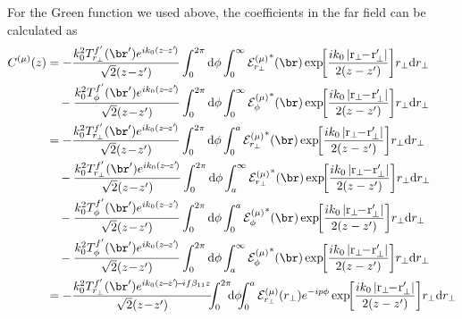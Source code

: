 \documentclass[]{report}
\begin{document}
For the Green function we used above, the coefficients in the far field can be calculated as
\begin{align}
C^{(\mu)} (z) &= - \frac{k_0^2 T^{f'}_{r_\perp}(\br') e^{ik_0(z\!-\!z'\!)}}{\sqrt{2}(z\!-\!z')}\int_0^{2\pi}\mathrm{d}\phi \int_0^\infty {\mathcal{E}^{(\mu)}_{r_\perp}}^* (\br) \exp\!\! \left[ \frac{ik_0 \left| \mathrm{r}_\perp\!\! -\! \mathrm{r}_\perp'\right|}{2(z-z')}  \right]\!  r_\perp \mathrm{d}r_\perp \nonumber\\
&\quad - \frac{k_0^2 T^{f'}_\phi(\br') e^{ik_0(z\!-\!z'\!)} }{\sqrt{2}(z\!-\!z')}\int_0^{2\pi}\mathrm{d}\phi \int_0^\infty {\mathcal{E}^{(\mu)}_\phi}^* (\br) \exp\!\! \left[ \frac{ik_0 \left| \mathrm{r}_\perp\!\! -\! \mathrm{r}_\perp'\right|}{2(z-z')}  \right]\!  r_\perp \mathrm{d}r_\perp \\
&=  - \frac{k_0^2 T^{f'}_{r_\perp}(\br') e^{ik_0(z\!-\!z'\!)}}{\sqrt{2}(z\!-\!z')}\int_0^{2\pi}\mathrm{d}\phi \int_0^a {\mathcal{E}^{(\mu)}_{r_\perp}}^* (\br) \exp\!\! \left[ \frac{ik_0 \left| \mathrm{r}_\perp\!\! -\! \mathrm{r}_\perp'\right|}{2(z-z')}  \right]\!  r_\perp \mathrm{d}r_\perp \nonumber\\
&\quad - \frac{k_0^2 T^{f'}_{r_\perp}(\br') e^{ik_0(z\!-\!z'\!)}}{\sqrt{2}(z\!-\!z')}\int_0^{2\pi}\mathrm{d}\phi \int_a^\infty {\mathcal{E}^{(\mu)}_{r_\perp}}^* (\br) \exp\!\! \left[ \frac{ik_0 \left| \mathrm{r}_\perp\!\! -\! \mathrm{r}_\perp'\right|}{2(z-z')}  \right]\!  r_\perp \mathrm{d}r_\perp \nonumber\\
&\quad - \frac{k_0^2 T^{f'}_\phi(\br') e^{ik_0(z\!-\!z'\!)}}{\sqrt{2}(z\!-\!z')}\int_0^{2\pi}\mathrm{d}\phi \int_0^a {\mathcal{E}^{(\mu)}_\phi}^* (\br) \exp\!\! \left[ \frac{ik_0 \left| \mathrm{r}_\perp\!\! -\! \mathrm{r}_\perp'\right|}{2(z-z')}  \right]\!  r_\perp \mathrm{d}r_\perp \nonumber\\
&\quad - \frac{k_0^2 T^{f'}_\phi(\br') e^{ik_0(z\!-\!z'\!)}}{\sqrt{2}(z\!-\!z')}\int_0^{2\pi}\mathrm{d}\phi \int_a^\infty {\mathcal{E}^{(\mu)}_\phi}^* (\br) \exp\!\! \left[ \frac{ik_0 \left| \mathrm{r}_\perp\!\! -\! \mathrm{r}_\perp'\right|}{2(z-z')}  \right]\!  r_\perp \mathrm{d}r_\perp \\
&= - \frac{k_0^2 T^{f'}_{r_\perp}(\br') e^{ik_0(z\!-\!z'\!)\!-\!if\beta_{11} z}}{\sqrt{2}(z\!-\!z')}  \!\!\! \int_0^{2\pi}\!\!\! \mathrm{d}\phi \!\!\! \int_0^a   \mathcal{E}^{(\mu)}_{r_\perp}(r_\perp) e^{-i p\phi} 
\exp\!\! \left[ \frac{ik_0 \left| \mathrm{r}_\perp\!\! -\! \mathrm{r}_\perp'\right|}{2(z-z')}  \right]\!  r_\perp \mathrm{d}r_\perp \nonumber\\

\end{align}
\end{document}
